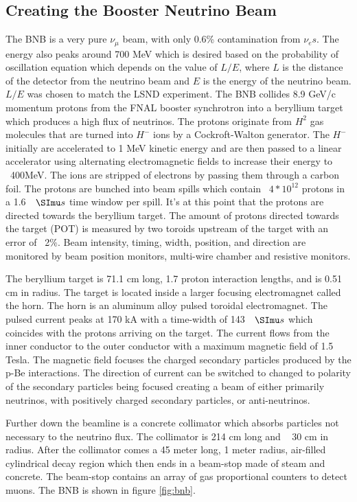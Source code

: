 \subsection{Creating the Booster Neutrino Beam}
The BNB is a very pure $\nu_{\mu}$ beam, with only 0.6\% contamination from $\nu_{e}s$. The energy also peaks around 700 MeV which is desired based on the probability of oscillation equation which depends on the value of $L/E$, where $L$ is the distance of the detector from the neutrino beam and $E$ is the energy of the neutrino beam. $L/E$ was chosen to match the LSND experiment. The BNB collides 8.9 GeV/c momentum protons from the FNAL booster synchrotron into a beryllium target which produces a high flux of neutrinos. The protons originate from $H^2$ gas molecules that are turned into $H^-$ ions by a Cockroft-Walton generator. The $H^-$ initially are accelerated to 1 MeV kinetic energy and are then passed to a linear accelerator using alternating electromagnetic fields to increase their energy to ~400MeV. The ions are stripped of electrons by passing them through a carbon foil. The protons are bunched into beam spills which contain ~$4*10^12$ protons in a 1.6 $\micro s$ time window per spill. 
It's at this point that the protons are directed towards the beryllium target. The amount of protons directed towards the target (POT) is measured by two toroids upstream of the target with an error of ~2$\%$. Beam intensity, timing, width, position, and direction are monitored by beam position monitors, multi-wire chamber and resistive monitors. 

The beryllium target is 71.1 cm long, 1.7 proton interaction lengths, and is 0.51 cm in radius. The target is located inside a larger focusing electromagnet called the horn. The horn is an aluminum alloy pulsed toroidal electromagnet. The pulsed current peaks at 170 kA with a time-width of 143 $\micro s$ which coincides with the protons arriving on the target. The current flows from the inner conductor to the outer conductor with a maximum magnetic field of 1.5 Tesla. The magnetic field focuses the charged secondary particles produced by the p-Be interactions. The direction of current can be switched to changed to polarity of the secondary particles being focused creating a beam of either primarily neutrinos, with positively charged secondary particles, or anti-neutrinos. 

Further down the beamline is a concrete collimator which absorbs particles not necessary to the neutrino flux. The collimator is 214 cm long and ~ 30 cm in radius. After the collimator comes a 45 meter long, 1 meter radius, air-filled cylindrical decay region which then ends in a beam-stop made of steam and concrete. The beam-stop contains an array of gas proportional counters to detect muons. The BNB is shown in figure \ref{fig:bnb}.      

